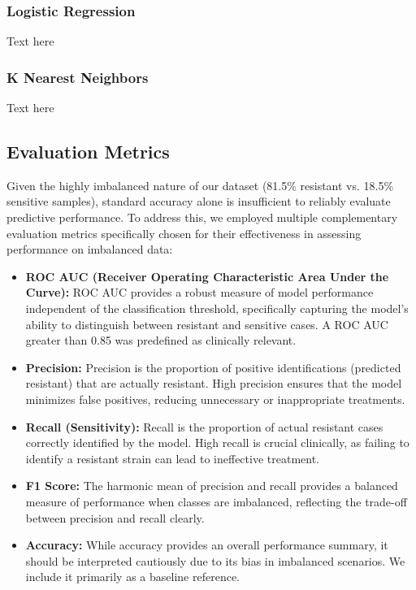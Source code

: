 \documentclass{article}
\begin{document}
\subsubsection{Logistic Regression}
Text here

\subsubsection{K Nearest Neighbors}
Text here


\subsection{Evaluation Metrics}

Given the highly imbalanced nature of our dataset (81.5\% resistant vs. 18.5\% sensitive samples), standard accuracy alone is insufficient to reliably evaluate predictive performance. To address this, we employed multiple complementary evaluation metrics specifically chosen for their effectiveness in assessing performance on imbalanced data:

\begin{itemize}
    \item \textbf{ROC AUC (Receiver Operating Characteristic Area Under the Curve):} 
    ROC AUC provides a robust measure of model performance independent of the classification threshold, specifically capturing the model's ability to distinguish between resistant and sensitive cases. A ROC AUC greater than 0.85 was predefined as clinically relevant.

    \item \textbf{Precision:} Precision is the proportion of positive identifications (predicted resistant) that are actually resistant. High precision ensures that the model minimizes false positives, reducing unnecessary or inappropriate treatments.

    \item \textbf{Recall (Sensitivity):} Recall is the proportion of actual resistant cases correctly identified by the model. High recall is crucial clinically, as failing to identify a resistant strain can lead to ineffective treatment.

    \item \textbf{F1 Score:} The harmonic mean of precision and recall provides a balanced measure of performance when classes are imbalanced, reflecting the trade-off between precision and recall clearly.

    \item \textbf{Accuracy:} While accuracy provides an overall performance summary, it should be interpreted cautiously due to its bias in imbalanced scenarios. We include it primarily as a baseline reference.
\end{itemize}
\end{document}

